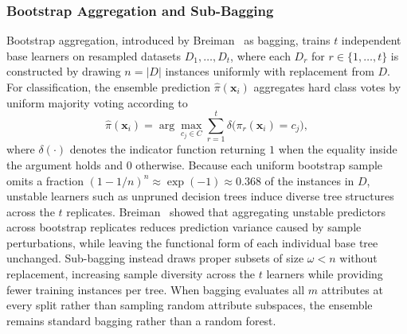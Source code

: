 \subsubsection{Bootstrap Aggregation and Sub-Bagging}
Bootstrap aggregation, introduced by Breiman~\cite{Breiman1996} as bagging, trains $t$ independent base learners on resampled datasets $D_1, \dots, D_t$, where each $D_r$ for $r \in \{1, \dots, t\}$ is constructed by drawing $n = |D|$ instances uniformly with replacement from $D$. For classification, the ensemble prediction $\hat{\pi}(\mathbf{x}_i)$ aggregates hard class votes by uniform majority voting according to
\begin{equation}
    \hat{\pi}(\mathbf{x}_i) = \arg\max_{c_j \in C} \sum_{r=1}^t \delta\bigl(\pi_r(\mathbf{x}_i) = c_j\bigr),
    \label{eq:bagging_vote}
\end{equation}
where $\delta(\cdot)$ denotes the indicator function returning $1$ when the equality inside the argument holds and $0$ otherwise. Because each uniform bootstrap sample omits a fraction $(1 - 1/n)^n \approx \exp(-1) \approx 0.368$ of the instances in $D$, unstable learners such as unpruned decision trees induce diverse tree structures across the $t$ replicates. Breiman~\cite{Breiman1996} showed that aggregating unstable predictors across bootstrap replicates reduces prediction variance caused by sample perturbations, while leaving the functional form of each individual base tree unchanged. Sub-bagging instead draws proper subsets of size $\omega < n$ without replacement, increasing sample diversity across the $t$ learners while providing fewer training instances per tree. When bagging evaluates all $m$ attributes at every split rather than sampling random attribute subspaces, the ensemble remains standard bagging rather than a random forest.

